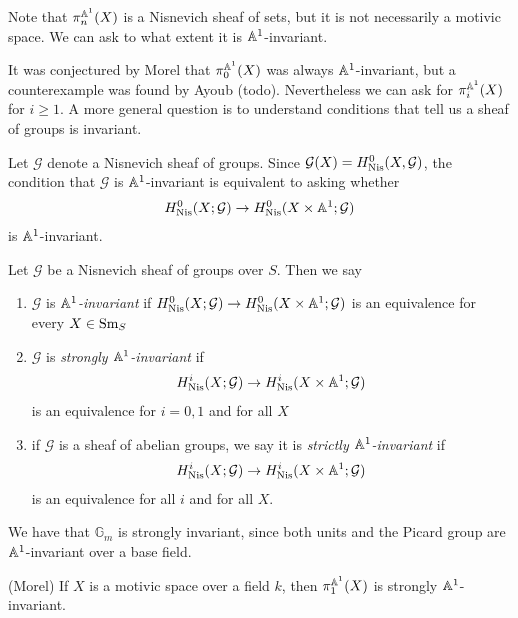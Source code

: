 \documentclass[11pt,openany]{book}
\begin{document}
Note that $\pi_n^{\mathbb{A}^1}(X)$ is a Nisnevich sheaf of sets, but it is not necessarily a motivic space. We can ask to what extent it is $\mathbb{A}^1$-invariant.

It was conjectured by Morel that $\pi_0^{\mathbb{A}^1}(X)$ was always $\mathbb{A}^1$-invariant, but a counterexample was found by Ayoub (todo). Nevertheless we can ask for $\pi_i^{\mathbb{A}^1}(X)$ for $i\ge 1$. A more general question is to understand conditions that tell us a sheaf of groups is invariant.

Let $\mathcal{G}$ denote a Nisnevich sheaf of groups. Since $\mathcal{G}(X) = H^0_{\mathrm{Nis}}(X,\mathcal{G})$, the condition that $\mathcal{G}$ is $\mathbb{A}^1$-invariant is equivalent to asking whether
\begin{align*}
    H^0_{\mathrm{Nis}}(X; \mathcal{G}) \to H^0_{\mathrm{Nis}}(X \times \mathbb{A}^1 ; \mathcal{G})
\end{align*}
is $\mathbb{A}^1$-invariant.


\begin{definition} Let $\mathcal{G}$ be a Nisnevich sheaf of groups over $S$. Then we say
\begin{enumerate}
    \item $\mathcal{G}$ is $\mathbb{A}^1$\textit{-invariant} if $H^0_{\mathrm{Nis}}(X; \mathcal{G}) \to H^0_{\mathrm{Nis}}(X \times \mathbb{A}^1 ; \mathcal{G})$ is an equivalence for every $X\in \mathrm{Sm}_S$
    \item $\mathcal{G}$ is \textit{strongly $\mathbb{A}^1$-invariant} if
    \begin{align*}
        H^i_{\mathrm{Nis}}(X; \mathcal{G}) \to H^i_{\mathrm{Nis}}(X \times \mathbb{A}^1; \mathcal{G})
    \end{align*}
    is an equivalence for $i=0,1$ and for all $X$
    \item if $\mathcal{G}$ is a sheaf of abelian groups, we say it is \textit{strictly $\mathbb{A}^1$-invariant} if
    \begin{align*}
        H^i_{\mathrm{Nis}}(X; \mathcal{G}) \to H^i_{\mathrm{Nis}}(X \times \mathbb{A}^1; \mathcal{G})
    \end{align*}
    is an equivalence for all $i$ and for all $X$.
\end{enumerate}
\end{definition}


\begin{example} We have that $\mathbb{G}_m$ is strongly invariant, since both units and the Picard group are $\mathbb{A}^1$-invariant over a base field.
\end{example}

\begin{theorem}\label{thm:pi1-strongly-invt} 
(Morel) If $X$ is a motivic space over a field $k$, then $\pi_1^{\mathbb{A}^1}(X)$ is strongly $\mathbb{A}^1$-invariant.
\end{theorem}
\end{document}
